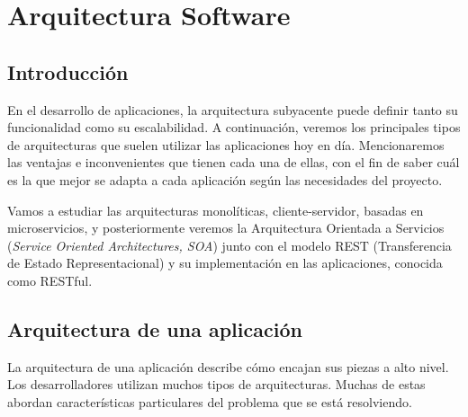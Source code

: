 \chapter{Arquitectura Software}
\section{Introducción}
En el desarrollo de aplicaciones, la arquitectura subyacente puede definir tanto su funcionalidad como su escalabilidad. A continuación, veremos los principales tipos de arquitecturas que suelen utilizar las aplicaciones hoy en día. Mencionaremos las ventajas e inconvenientes que tienen cada una de ellas, con el fin de saber cuál es la que mejor se adapta a cada aplicación según las necesidades del proyecto. 

Vamos a estudiar las arquitecturas monolíticas, cliente-servidor, basadas en microservicios, y posteriormente veremos la Arquitectura Orientada a Servicios (\textit{Service Oriented Architectures, SOA}) junto con el modelo REST (Transferencia de Estado Representacional) y su implementación en las aplicaciones, conocida como RESTful.
\section{Arquitectura de una aplicación}
La arquitectura de una aplicación describe cómo encajan sus piezas a alto nivel. Los desarrolladores utilizan muchos tipos de arquitecturas. Muchas de estas abordan características particulares del problema que se está resolviendo.

